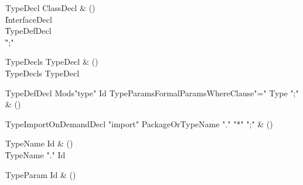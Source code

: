 \begin{bbgrammar}

TypeDecl \label{prod:TypeDecl}  \: ClassDecl & () \\

    \| InterfaceDecl \\
    \| TypeDefDecl \\
    \| \xcd";" \\

\end{bbgrammar}

\begin{bbgrammar}

TypeDecls \label{prod:TypeDecls}  \: TypeDecl & () \\

    \| TypeDecls TypeDecl \\

\end{bbgrammar}

\begin{bbgrammar}

TypeDefDecl \label{prod:TypeDefDecl}  \: Mods\opt \xcd"type" Id TypeParams\opt FormalParams\opt WhereClause\opt \xcd"=" Type \xcd";" & () \\


\end{bbgrammar}

\begin{bbgrammar}

TypeImportOnDemandDecl \label{prod:TypeImportOnDemandDecl}  \: \xcd"import" PackageOrTypeName \xcd"." \xcd"*" \xcd";" & () \\


\end{bbgrammar}

\begin{bbgrammar}

TypeName \label{prod:TypeName}  \: Id & () \\

    \| TypeName \xcd"." Id \\

\end{bbgrammar}

\begin{bbgrammar}

TypeParam \label{prod:TypeParam}  \: Id & () \\


\end{bbgrammar}

